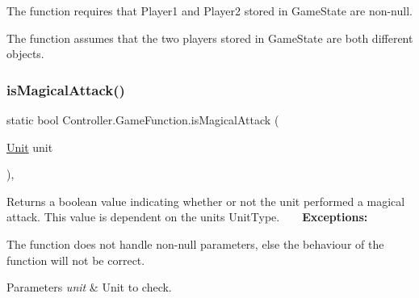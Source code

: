 \begin{DoxyItemize}
\item The function requires that Player1 and Player2 stored in Game\+State are non-\/null.
\item The function assumes that the two players stored in Game\+State are both different objects. 
\end{DoxyItemize}\hypertarget{class_controller_1_1_game_function_a4f53c0a0edffecda9dea3fc3cd22b43e}{}\label{class_controller_1_1_game_function_a4f53c0a0edffecda9dea3fc3cd22b43e} 
\subsubsection{\texorpdfstring{is\+Magical\+Attack()}{isMagicalAttack()}}
{\footnotesize\ttfamily static bool Controller.\+Game\+Function.\+is\+Magical\+Attack (\begin{DoxyParamCaption}\item[{\hyperlink{interface_model_1_1_unit_module_1_1_unit}{Unit}}]{unit }\end{DoxyParamCaption})\hspace{0.3cm}{\ttfamily [inline]}, {\ttfamily [static]}}

Returns a boolean value indicating whether or not the unit performed a magical attack. This value is dependent on the unit\textquotesingle{}s Unit\+Type. ~\newline
~\newline
 {\bfseries Exceptions\+:} ~\newline

\begin{DoxyItemize}
\item The function does not handle non-\/null parameters, else the behaviour of the function will not be correct. 
\begin{DoxyParams}{Parameters}
{\em unit} & Unit to check. \\
\hline
\end{DoxyParams}

\end{DoxyItemize}\hypertarget{class_controller_1_1_game_function_a0878926921f4745c61645234142819ff}{}\label{class_controller_1_1_game_function_a0878926921f4745c61645234142819ff} 
